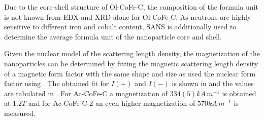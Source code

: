 \documentclass[\main/dresen_thesis.tex]{subfiles}
\begin{document}
      Due to the core-shell structure of Ol-CoFe-C, the composition of the formula unit is not known from EDX and XRD alone for Ol-CoFe-C.
      As neutrons are highly sensitive to different iron and cobalt content, SANS is additionally used to determine the average formula unit of the nanoparticle core and shell.
      

      Given the nuclear model of the scattering length density, the magnetization of the nanoparticles can be determined by fitting the magnetic scattering length density of a magnetic form factor with the same shape and size as used the nuclear form factor using .
      The obtained fit for $I(+)$ and $I(-)$ is shown in  and the values are tabulated in .
      For Ac-CoFe-C a magnetization of $334(5) \unit{kA \, m^{-1}}$ is obtained at $1.2 \unit{T}$ and for Ac-CoFe-C-2 an even higher magnetization of $570 \unit{kA \, m^{-1}}$ is measured.





\end{document}
